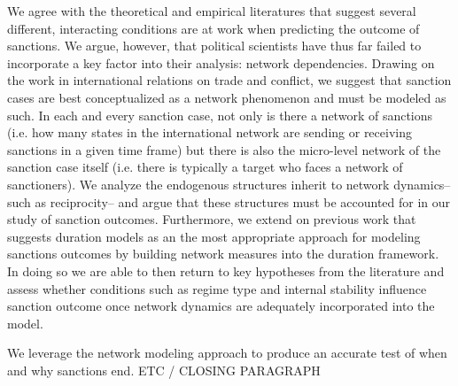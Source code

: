 We agree with the theoretical and empirical literatures that suggest several different, interacting conditions are at work when predicting the outcome of sanctions. We argue, however, that political scientists have thus far failed to incorporate a key factor into their analysis: network dependencies. Drawing on the work in international relations on trade and conflict, we suggest that sanction cases are best conceptualized as a network phenomenon and must be modeled as such. In each and every sanction case, not only is there a network of sanctions (i.e. how many states in the international network are sending or receiving sanctions in a given time frame) but there is also the micro-level network of the sanction case itself (i.e. there is typically a target who faces a network of sanctioners). We analyze the endogenous structures inherit to network dynamics--such as reciprocity-- and argue that these structures must be accounted for in our study of sanction outcomes. Furthermore, we extend on previous work that suggests duration models as an the most appropriate approach for modeling sanctions outcomes by building network measures into the duration framework. In doing so we are able to then return to key hypotheses from the literature and assess whether conditions such as regime type and internal stability influence sanction outcome once network dynamics are adequately incorporated into the model. 

We leverage the network modeling approach to produce an accurate test of when and why sanctions end. ETC / CLOSING PARAGRAPH
